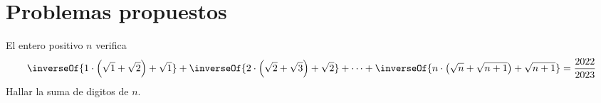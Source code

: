 \section{Problemas propuestos}

\begin{section-problem}
    El entero positivo $n$ verifica
    \[\inverseOf{1\cdot\left(\sqrt {1} + \sqrt {2}\right) + \sqrt {1}} + \inverseOf{2\cdot\left(\sqrt {2} + \sqrt {3}\right) + \sqrt {2}} + \cdots + \inverseOf{n\cdot\left(\sqrt {n} + \sqrt {n + 1}\right) + \sqrt {n + 1}} = \frac{2022}{2023}\]
    Hallar la suma de digitos de $n$.
\end{section-problem}